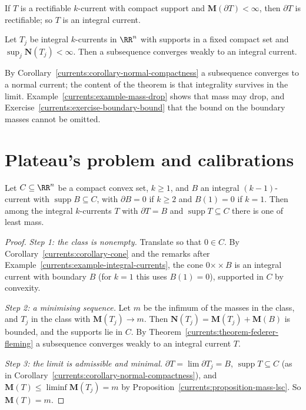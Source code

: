 \begin{theorem}\label{currents:theorem-boundary-rectifiability}
If $T$ is a rectifiable $k$-current with compact support and $\mathbf{M}(\partial T) < \infty$, then $\partial T$ is rectifiable; so $T$ is an integral current.
\end{theorem}

\begin{theorem}\label{currents:theorem-federer-fleming}
Let $T_j$ be integral $k$-currents in $\RR^n$ with supports in a fixed compact set and $\sup_j\mathbf{N}(T_j) < \infty$. Then a subsequence converges weakly to an integral current.
\end{theorem}

By Corollary~\ref{currents:corollary-normal-compactness} a subsequence converges to a normal current; the content of the theorem is that integrality survives in the limit. Example~\ref{currents:example-mass-drop}
shows that mass may drop, and Exercise~\ref{currents:exercise-boundary-bound} that the bound on the boundary masses cannot be omitted.

\section{Plateau's problem and calibrations}\label{currents:section-plateau}

\begin{theorem}\label{currents:theorem-plateau}
Let $C \subseteq \RR^n$ be a compact convex set, $k \geq 1$, and $B$ an integral $(k-1)$-current with $\operatorname{supp}B \subseteq C$, with $\partial B = 0$ if $k \geq 2$ and $B(1) = 0$ if $k = 1$. Then among the integral
$k$-currents $T$ with $\partial T = B$ and $\operatorname{supp}T \subseteq C$ there is one of least mass.
\end{theorem}

\begin{proof}
\emph{Step 1: the class is nonempty.} Translate so that $0 \in C$. By Corollary~\ref{currents:corollary-cone} and the remarks after Example~\ref{currents:example-integral-currents}, the cone $0 \mathbin{\times\!\!\!\!\times} B$ is an
integral current with boundary $B$ (for $k = 1$ this uses $B(1) = 0$), supported in $C$ by convexity.

\emph{Step 2: a minimising sequence.} Let $m$ be the infimum of the masses in the class, and $T_j$ in the class with $\mathbf{M}(T_j) \to m$. Then $\mathbf{N}(T_j) = \mathbf{M}(T_j) + \mathbf{M}(B)$ is bounded, and the supports lie in
$C$. By Theorem~\ref{currents:theorem-federer-fleming} a subsequence converges weakly to an integral current $T$.

\emph{Step 3: the limit is admissible and minimal.} $\partial T = \lim\partial T_j = B$, $\operatorname{supp}T \subseteq C$ (as in Corollary~\ref{currents:corollary-normal-compactness}), and
$\mathbf{M}(T) \leq \liminf\mathbf{M}(T_j) = m$ by Proposition~\ref{currents:proposition-mass-lsc}. So $\mathbf{M}(T) = m$.
\end{proof}

